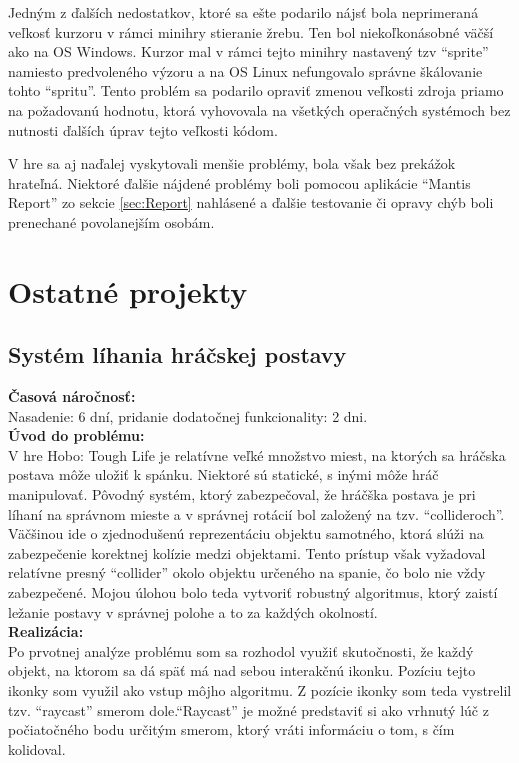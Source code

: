 \documentclass[slovak, bachelorpractice]{diploma}
\begin{document}
Jedným z ďalších nedostatkov, ktoré sa ešte podarilo nájsť bola neprimeraná veľkosť kurzoru v rámci minihry stieranie žrebu. Ten bol niekoľkonásobné väčší ako na OS Windows. Kurzor mal v rámci tejto minihry nastavený tzv \enquote{sprite} namiesto predvoleného výzoru a na OS Linux nefungovalo správne škálovanie tohto \enquote{spritu}. Tento problém sa podarilo opraviť zmenou veľkosti zdroja priamo na požadovanú hodnotu, ktorá vyhovovala na všetkých operačných systémoch bez nutnosti ďalších úprav tejto veľkosti kódom.

V hre sa aj naďalej vyskytovali menšie problémy, bola však bez prekážok hrateľná. Niektoré ďalšie nájdené problémy boli pomocou aplikácie \enquote{Mantis Report} zo sekcie \ref{sec:Report} nahlásené a ďalšie testovanie či opravy chýb boli prenechané povolanejším osobám.

\section{Ostatné projekty}
\label{sec:Others}
\subsection{Systém líhania hráčskej postavy}
\label{sec:sleep}
\textbf{Časová náročnosť:} \\ Nasadenie: 6 dní, pridanie dodatočnej funkcionality: 2 dni.\\
\textbf{Úvod do problému:} \\ V hre Hobo: Tough Life je relatívne veľké množstvo miest, na ktorých sa hráčska postava môže uložiť k spánku. Niektoré sú statické, s inými môže hráč manipulovať. Pôvodný systém, ktorý zabezpečoval, že hráčška postava je pri líhaní na správnom mieste a v správnej rotácií bol založený na tzv. \enquote{collideroch}. Väčšinou ide o zjednodušenú reprezentáciu objektu samotného, ktorá slúži na zabezpečenie korektnej kolízie medzi objektami. Tento prístup však vyžadoval relatívne presný \enquote{collider} okolo objektu určeného na spanie, čo bolo nie vždy zabezpečené. Mojou úlohou bolo teda vytvoriť robustný algoritmus, ktorý zaistí ležanie postavy v správnej polohe a to za každých okolností.  \\
\textbf{Realizácia:} \\ Po prvotnej analýze problému som sa rozhodol využiť skutočnosti, že každý objekt, na ktorom sa dá späť má nad sebou interakčnú ikonku. Pozíciu tejto ikonky som využil ako vstup môjho algoritmu. Z pozície ikonky som teda vystrelil tzv. \enquote{raycast} smerom dole.\enquote{Raycast} je možné predstaviť si ako vrhnutý lúč z počiatočného bodu určitým smerom, ktorý vráti informáciu o tom, s čím kolidoval.
\end{document}
